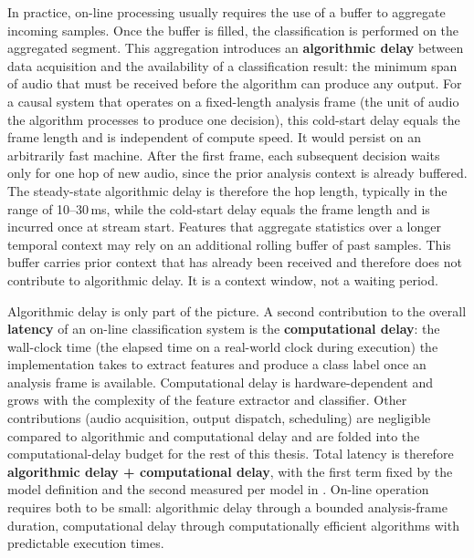 In practice, on-line processing usually requires the use of a buffer to aggregate incoming samples.
Once the buffer is filled, the classification is performed on the aggregated segment.
This aggregation introduces an \textbf{algorithmic delay} between data acquisition and the availability of a classification result: the minimum span of audio that must be received before the algorithm can produce any output.
For a causal system that operates on a fixed-length analysis frame (the unit of audio the algorithm processes to produce one decision), this cold-start delay equals the frame length and is independent of compute speed.
It would persist on an arbitrarily fast machine.
After the first frame, each subsequent decision waits only for one hop of new audio, since the prior analysis context is already buffered.
The steady-state algorithmic delay is therefore the hop length, typically in the range of 10--30\,ms, while the cold-start delay equals the frame length and is incurred once at stream start.
Features that aggregate statistics over a longer temporal context may rely on an additional rolling buffer of past samples.
This buffer carries prior context that has already been received and therefore does not contribute to algorithmic delay.
It is a context window, not a waiting period.

Algorithmic delay is only part of the picture.
A second contribution to the overall \textbf{latency} of an on-line classification system is the \textbf{computational delay}: the wall-clock time (the elapsed time on a real-world clock during execution) the implementation takes to extract features and produce a class label once an analysis frame is available.
Computational delay is hardware-dependent and grows with the complexity of the feature extractor and classifier.
Other contributions (audio acquisition, output dispatch, scheduling) are negligible compared to algorithmic and computational delay and are folded into the computational-delay budget for the rest of this thesis.
Total latency is therefore \textbf{algorithmic delay + computational delay}, with the first term fixed by the model definition and the second measured per model in .
On-line operation requires both to be small: algorithmic delay through a bounded analysis-frame duration, computational delay through computationally efficient algorithms with predictable execution times.

